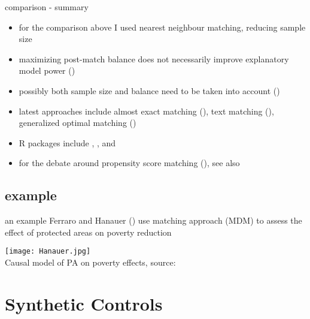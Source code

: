 \documentclass[aspectratio=169]{beamer}
\begin{document}
		\begin{frame}{comparison - summary}
			\begin{itemize}
				\item<1-> for the comparison above I used nearest neighbour matching, reducing sample size
				\item<2-> maximizing post-match balance does not necessarily improve explanatory model power (\cite{Colson2016})
				\item<3-> possibly both sample size and balance need to be taken into account (\cite{King2017})
				\item<4-> latest approaches include almost exact matching (\cite{Dieng2018,Dieng2021}), text matching (\cite{Roberts2020a}), generalized optimal matching (\cite{Kallus2020})
				\item<5-> R packages include \href{https://cran.r-project.org/web/packages/MatchIt/vignettes/MatchIt.html}{\underline{}}, \href{http://sekhon.berkeley.edu/matching/}{\underline{}}, and \href{https://github.com/insongkim/PanelMatch}{\underline{}}
				\item<6> for the debate around propensity score matching (\cite{King2019}), see also \href{https://p-hunermund.com/2019/02/06/why-so-much-hate-against-propensity-score-matching/amp/)}{\underline{}}
			\end{itemize}
		\end{frame}

	\subsection{example}
		\begin{frame}{an example}
			Ferraro and Hanauer (\citeyear{Ferraro2014}) use matching approach (MDM) to assess the effect of protected areas on poverty reduction
			\begin{center}
				\texttt{[image: Hanauer.jpg]}
				\\\tiny{Causal model of PA on poverty effects, source: \cite{Ferraro2014}}
			\end{center}
		\end{frame}

\section{Synthetic Controls}
\end{document}
